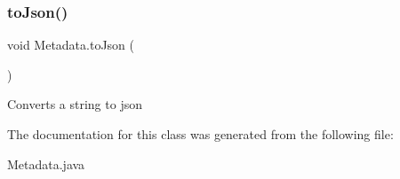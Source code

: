 \subsubsection{\texorpdfstring{to\+Json()}{toJson()}}
{\footnotesize\ttfamily void Metadata.\+to\+Json (\begin{DoxyParamCaption}{ }\end{DoxyParamCaption})\hspace{0.3cm}{\ttfamily [inline]}}

Converts a string to json 

The documentation for this class was generated from the following file\+:\begin{DoxyCompactItemize}
\item 
Metadata.\+java\end{DoxyCompactItemize}
